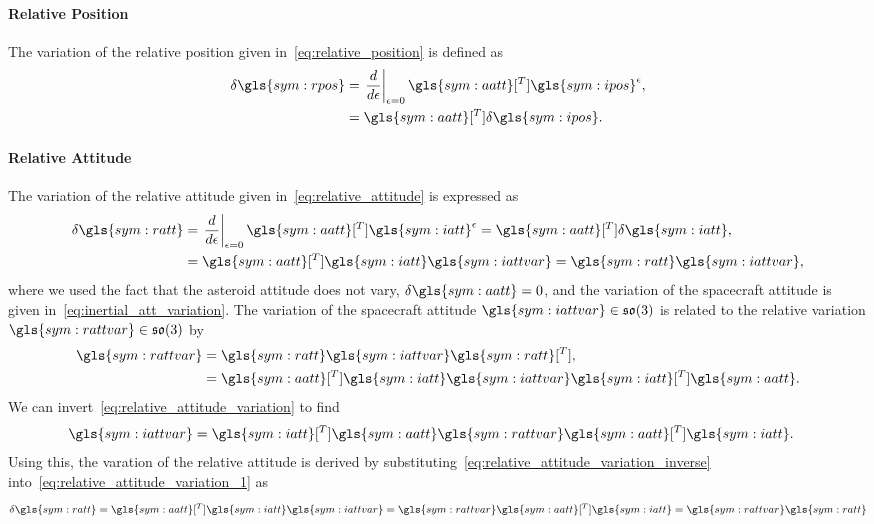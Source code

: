 \paragraph{Relative Position}\label{sec:relative_position_variation}
The variation of the relative position given in~\cref{eq:relative_position} is defined as
\begin{align*}
    \delta \gls{sym:rpos} &= \left. \diff{}{\epsilon} \right|_{\epsilon=0} \gls{sym:aatt}[^T] \gls{sym:ipos}^\epsilon ,\nonumber \\
                        &= \gls{sym:aatt}[^T] \delta \gls{sym:ipos}.
\end{align*}

\paragraph{Relative Attitude}\label{sec:relative_attitude_variation}
The variation of the relative attitude given in~\cref{eq:relative_attitude} is expressed as
\begin{align}
    \delta \gls{sym:ratt} &= \left. \diff{}{\epsilon} \right|_{\epsilon=0}  \gls{sym:aatt}[^T] \gls{sym:iatt}^\epsilon = \gls{sym:aatt}[^T] \delta \gls{sym:iatt}, \nonumber\\
                          &= \gls{sym:aatt}[^T] \gls{sym:iatt} \gls{sym:iattvar} = \gls{sym:ratt} \gls{sym:iattvar}, \label{eq:relative_attitude_variation_1}
\end{align}
where we used the fact that the asteroid attitude does not vary, \( \delta \gls{sym:aatt} = 0\), and the variation of the spacecraft attitude is given in~\cref{eq:inertial_att_variation}.
The variation of the spacecraft attitude \( \gls{sym:iattvar} \in \so \) is related to the relative variation \( \gls{sym:rattvar} \in \so \) by
\begin{align}
    \gls{sym:rattvar} &= \gls{sym:ratt} \gls{sym:iattvar} \gls{sym:ratt}[^T],\nonumber\\
                      &= \gls{sym:aatt}[^T] \gls{sym:iatt} \gls{sym:iattvar} \gls{sym:iatt}[^T] \gls{sym:aatt}.
\end{align}
We can invert~\cref{eq:relative_attitude_variation} to find
\begin{align}\label{eq:relative_attitude_variation_inverse}
    \gls{sym:iattvar} &= \gls{sym:iatt}[^T] \gls{sym:aatt} \gls{sym:rattvar} \gls{sym:aatt}[^T] \gls{sym:iatt}.
\end{align}
Using this, the varation of the relative attitude is derived by substituting~\cref{eq:relative_attitude_variation_inverse} into~\cref{eq:relative_attitude_variation_1} as
\begin{align}\label{eq:relative_attitude_matrix_variation}
    \delta \gls{sym:ratt} = \gls{sym:aatt}[^T] \gls{sym:iatt} \gls{sym:iattvar} = \gls{sym:rattvar} \gls{sym:aatt}[^T] \gls{sym:iatt} = \gls{sym:rattvar} \gls{sym:ratt}
\end{align}

